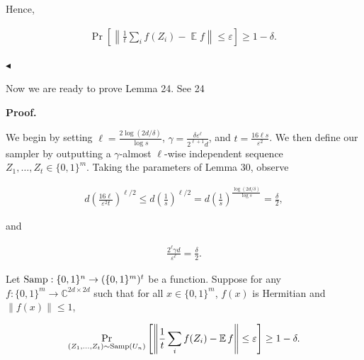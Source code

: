 Hence,\par


\[\begin{gathered}
\Pr\left[\left\lVert\frac{1}{t}\sum_{i}f(Z_{i})-\operatorname*{\mathbb{E}}f\right\rVert\leq\varepsilon\right]\geq 1-\delta.\
\end{gathered}\]


$\blacktriangleleft$\par




Now we are ready to prove Lemma 24.
See 24\par





\par\medskip\noindent\textbf{Proof.}\par




We begin by setting $\ell=\frac{2\log(2d/\delta)}{\log s}$, $\gamma=\frac{\delta\varepsilon^{\ell}}{2^{\ell+1}d}$, and $t=\frac{16\ell s}{\varepsilon^{2}}$. We then define our sampler by outputting a $\gamma$-almost $\ell$-wise independent sequence $Z_{1},\dots,Z_{t}\in\{0,1\}^{m}$.
Taking the parameters of Lemma 30, observe\par


\[\begin{gathered}
d\left(\frac{16\ell}{\varepsilon^{2}t}\right)^{\ell/2}\leq d\left(\frac{1}{{s}}\right)^{\ell/2}=d\left(\frac{1}{{s}}\right)^{\frac{\log(2d/\delta)}{\log s}}=\frac{\delta}{2},
\end{gathered}\]


and\par


\[\begin{gathered}
\frac{2^{\ell}\gamma d}{\varepsilon^{\ell}}=\frac{\delta}{2}.
\end{gathered}\]




Let $\textup{{Samp}}:\{0,1\}^{n}\to(\{0,1\}^{m})^{t}$ be a function. Suppose for any $f:\{0,1\}^{m}\to\mathbb{C}^{2d\times 2d}$ such that for all $x\in\{0,1\}^{m}$, $f(x)$ is Hermitian and $\|f(x)\|\leq 1$,\par


\[\begin{gathered}
\Pr_{(Z_{1},\dots,Z_{t})\sim\textup{{Samp}}(U_{n})}\left[\left\lVert\frac{1}{t}\sum_{i}f(Z_{i})-\operatorname*{\mathbb{E}}f\right\rVert\leq\varepsilon\right]\geq 1-\delta.
\end{gathered}\]


